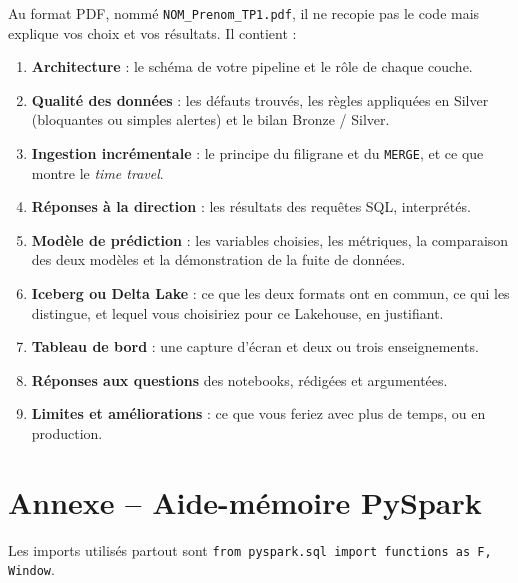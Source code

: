 \documentclass[11pt,a4paper]{article}
\newcommand{\cmd}[1]{\texttt{#1}}
\begin{document}
Au format PDF, nommé \cmd{NOM\_Prenom\_TP1.pdf}, il ne recopie pas le code mais explique vos choix
et vos résultats. Il contient :
\begin{enumerate}[leftmargin=*,itemsep=2pt]
  \item \textbf{Architecture} : le schéma de votre pipeline et le rôle de chaque couche.
  \item \textbf{Qualité des données} : les défauts trouvés, les règles appliquées en Silver
        (bloquantes ou simples alertes) et le bilan Bronze / Silver.
  \item \textbf{Ingestion incrémentale} : le principe du filigrane et du \cmd{MERGE}, et ce que montre
        le \emph{time travel}.
  \item \textbf{Réponses à la direction} : les résultats des requêtes SQL, interprétés.
  \item \textbf{Modèle de prédiction} : les variables choisies, les métriques, la comparaison des deux
        modèles et la démonstration de la fuite de données.
  \item \textbf{Iceberg ou Delta Lake} : ce que les deux formats ont en commun, ce qui les distingue,
        et lequel vous choisiriez pour ce Lakehouse, en justifiant.
  \item \textbf{Tableau de bord} : une capture d'écran et deux ou trois enseignements.
  \item \textbf{Réponses aux questions} des notebooks, rédigées et argumentées.
  \item \textbf{Limites et améliorations} : ce que vous feriez avec plus de temps, ou en production.
\end{enumerate}


\clearpage
\section*{Annexe -- Aide-mémoire PySpark}\label{sec:aidememoire}

Les imports utilisés partout sont \cmd{from pyspark.sql import functions as F, Window}.
\end{document}
